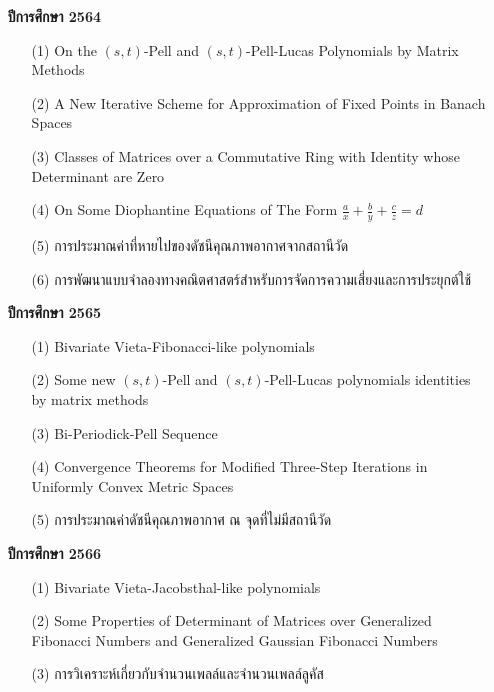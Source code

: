 \begin{enumerate}
\item[]{\bf ปีการศึกษา 2564}
\begin{itemize}
\item[(1)]  On the  $(s,t)$-Pell and  $(s,t)$-Pell-Lucas Polynomials by Matrix Methods
\item[(2)]  A New Iterative Scheme for Approximation of Fixed Points in Banach Spaces
\item[(3)]  Classes of Matrices over a Commutative Ring with Identity whose Determinant are Zero 
\item[(4)]  On Some Diophantine Equations of The Form $\frac{a}{x}+\frac{b}{y}+\frac{c}{z}=d$
\item[(5)]  การประมาณค่าที่หายไปของดัชนีคุณภาพอากาศจากสถานีวัด
\item[(6)]  การพัฒนาแบบจำลองทางคณิตศาสตร์สำหรับการจัดการความเสี่ยงและการประยุกต์ใช้
\end{itemize}

\item[]\textbf{ปีการศึกษา 2565}
\begin{itemize}
\item[(1)] Bivariate Vieta-Fibonacci-like polynomials

\item[(2)] Some new $(s,t)$-Pell and $(s,t)$-Pell-Lucas polynomials identities by matrix methods

\item[(3)]  Bi-Periodick-Pell Sequence

\item[(4)]  Convergence Theorems for Modified Three-Step Iterations in Uniformly Convex Metric Spaces 

\item[(5)]  การประมาณค่าดัชนีคุณภาพอากาศ ณ จุดที่ไม่มีสถานีวัด
\end{itemize}

\item[]\textbf{ปีการศึกษา 2566}
\begin{itemize}
\item[(1)] Bivariate Vieta-Jacobsthal-like polynomials

\item[(2)] Some Properties of Determinant of Matrices over Generalized Fibonacci Numbers and Generalized Gaussian Fibonacci Numbers

\item[(3)] การวิเคราะห์เกี่ยวกับจำนวนเพลล์และจำนวนเพลล์ลูคัส
\end{itemize}



\end{enumerate}
